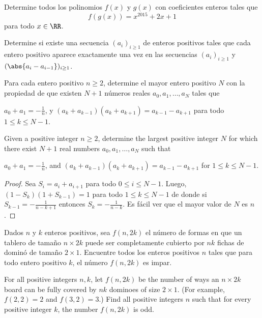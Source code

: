 \note[Miscelánea]{}

\begin{probEG}
  Determine todos los polinomios $f(x)$ y $g(x)$ con coeficientes enteros tales
  que
  \[f(g(x))=x^{2015}+2x+1\]
  para todo $x\in\RR$.
\end{probEG}

\begin{probEG}
  Determine si existe una secuencia $(a_i)_{i\ge 1}$ de enteros positivos tales
  que cada entero positivo aparece exactamente una vez en las secuencias
  $(a_i)_{i\ge 1}$ y $(\abs{a_i-a_{i-1}})_{i\ge 1}$.
\end{probEG}


\begin{probEG}[EGMO 2022/4]
  Para cada entero positivo $n\ge 2$, determine el mayor entero positivo $N$ con
  la propiedad de que existen $N+1$ números reales $a_0,a_1,\dots,a_N$ tales que
  \begin{enumerate}[(1)]
    \ii $a_0+a_1=-\frac1n$, y
    \ii $(a_k+a_{k-1})(a_k+a_{k+1})=a_{k-1}-a_{k+1}$ para todo $1\le k\le N-1$.
  \end{enumerate}
  \begin{hint}
    Given a positive integer $n\ge 2$, determine the largest positive integer
    $N$ for which there exist $N+1$ real numbers $a_0,a_1,\dots,a_N$ such that
    \begin{enumerate}[(1)]
      \ii $a_0+a_1=-\frac1n$, and
      \ii $(a_k+a_{k-1})(a_k+a_{k+1})=a_{k-1}-a_{k+1}$ for $1\le k\le N-1$.
    \end{enumerate}
  \end{hint}
\end{probEG}

\begin{proof}
  Sea $S_i=a_i+a_{i+1}$ para todo $0\le i\le N-1$. Luego, $(1-S_k)(1+S_{k-1})=1$
  para todo $1\le k\le N-1$ de donde si $S_{k-1}=-\frac{1}{n-k+1}$ entonces
  $S_k=-\frac{1}{n-k}$. Es fácil ver que el mayor valor de $N$ es $n$.
\end{proof}

\begin{probEG}[EGMO 2022/5]
  Dados $n$ y $k$ enteros positivos, sea $f(n,2k)$ el número de formas en que un
  tablero de tamaño $n\times 2k$ puede ser completamente cubierto por $nk$
  fichas de dominó de tamaño $2\times 1$. Encuentre todos los enteros positivos
  $n$ tales que para todo entero positivo $k$, el número $f(n,2k)$ es impar.
  \begin{hint}
    For all positive integers $n,k$, let $f(n,2k)$ be the number of ways an
    $n\times 2k$ board can be fully covered by $nk$ dominoes of size
    $2\times 1$. (For example, $f(2,2)=2$ and $f(3,2)=3$.) Find all positive
    integers $n$ such that for every positive integer $k$, the number $f(n,2k)$
    is odd.
  \end{hint}
\end{probEG}

